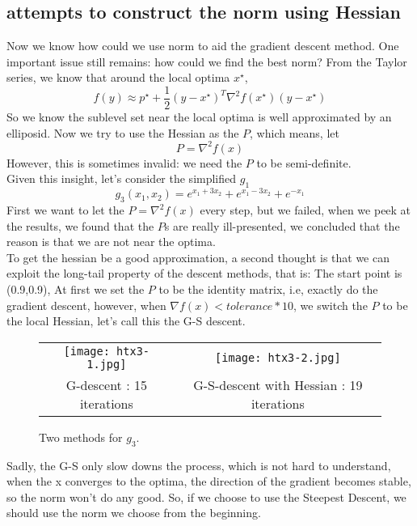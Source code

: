 \documentclass{acm_proc_article-sp}
\begin{document}
\subsection{attempts to construct the norm using Hessian}
Now we know how could we use norm to aid the gradient descent method. One important issue still remains: how could we find the best norm? From the Taylor series, we know that around the local optima $x^{\star}$,
\begin{displaymath}
f(y) \approx p^{\star} + \frac{1}{2} (y - x^\star)^T\nabla^2f(x^\star)(y-x^\star)
\end{displaymath}
So we know the sublevel set near the local optima is well approximated by an elliposid. Now we try to use the Hessian as the $P$, which means, let
\begin{displaymath}
P = \nabla^2f(x)
\end{displaymath}
However, this is sometimes invalid: we need the $P$ to be semi-definite.\\
Given this insight, let's consider the simplified $g_1$
\begin{displaymath}
g_3(x_1, x_2) = e ^ {x_1 + 3x_2} + e ^ {x_1-3x_2} + e^{-x_1}
\end{displaymath}
First we want to let the $P = \nabla^2f(x)$ every step, but we failed, when we peek at the results, we found that the $P$s are really ill-presented, we concluded that the reason is that we are not near the optima.\\
To get the hessian be a good approximation, a second thought is that we can exploit the long-tail property of the descent methods, that is: The start point is (0.9,0.9), At first we set the $P$ to be the identity matrix, i.e, exactly do the gradient descent, however, when $\nabla f(x) < tolerance * 10$, we switch the $P$ to be the local Hessian, let's call this the G-S descent.
\begin{figure*}[hp]
        \begin{tabular}{cc}
            \texttt{[image: htx3-1.jpg]} &
            \texttt{[image: htx3-2.jpg]} \\
            G-descent : 15 iterations&
            G-S-descent with Hessian : 19 iterations \\
        \end{tabular}
    \caption{\label{fig:htx3}Two methods for $g_3$.}
\end{figure*}
Sadly, the G-S only slow downs the process, which is not hard to understand, when the x converges to the optima, the direction of the gradient becomes stable, so the norm won't do any good. So, if we choose to use the Steepest Descent, we should use the norm we choose from the beginning.
\end{document}
